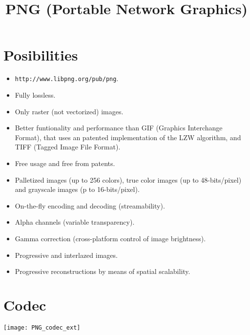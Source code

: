 \title{PNG (Portable Network Graphics)}

\maketitle
\tableofcontents

\section{Posibilities}
\begin{itemize}
\item \texttt{http://www.libpng.org/pub/png}.
\item Fully lossless.
\item Only raster (not vectorized) images.
\item Better funtionality and performance than GIF (Graphics
  Interchange Format), that uses an patented implementation of the LZW
  algorithm, and TIFF (Tagged Image File Format).
\item Free usage and free from patents.
\item Palletized images (up to 256 colors), true color images (up to
  48-bits/pixel) and grayscale images (p to 16-bits/pixel).
\item On-the-fly encoding and decoding (streamability).
\item Alpha channels (variable transparency).
\item Gamma correction (cross-platform control of image brightness).
\item Progressive and interlazed images.
\item Progressive reconstructions by means of spatial scalability.
\end{itemize} 

\section{Codec}
\begin{center}
\texttt{[image: PNG\_codec\_ext]}
\end{center}

